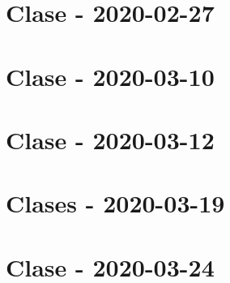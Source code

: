 \documentclass[openany]{book}
\begin{document}
\chapter{Clase - 2020-02-27}


\chapter{Clase - 2020-03-10}


\chapter{Clase - 2020-03-12}


\chapter{Clases - 2020-03-19}


\chapter{Clase - 2020-03-24}

\end{document}
